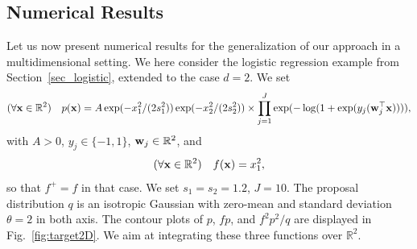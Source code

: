 \documentclass[review]{elsarticle}
\def\x{{\bf x}}
\def\w{{\bf w}}
\begin{document}
{%

\subsection{Numerical Results}

Let us now present numerical results for the generalization of our approach in a multidimensional setting. We here consider the logistic regression example from Section~\ref{sec_logistic}, extended to the case $d=2$. We set
\begin{equation}
(\forall \x \in \mathbb{R}^2) \quad p(\x) = A \exp(-x_1^2/(2 s_1^2)) \exp(-x_2^2/(2 s_2^2)) \times \prod_{j=1}^J \exp(-\log(1 + \exp(y_j (\w_j^\top \x)))),
\end{equation}
with $A>0$, $y_j \in \{-1,1\}$, $\w_j \in \mathbb{R}^2$, and
\begin{equation}
(\forall \x \in \mathbb{R}^2) \quad f(\x) = x_1^2,
\end{equation}
so that $f^+ = f$ in that case. We set $s_1 = s_2 = 1.2$, $J=10$. The proposal distribution $q$ is an isotropic Gaussian with zero-mean and standard deviation $\theta = 2$ in both axis. The contour plots of $p$, $f p$, and $f^2 p^2/q$ are displayed in Fig.~\ref{fig:target2D}. We aim at integrating these three functions over $\mathbb{R}^2$.  

}
\end{document}
